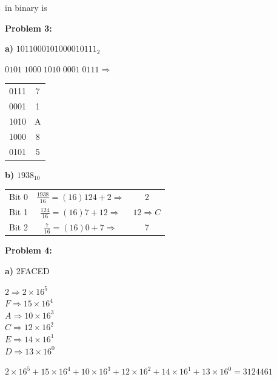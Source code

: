 \documentclass{article}
\begin{document}
    \quad{} in binary is 

    \textbf{Problem 3:}

    \quad \textbf{a)} $1011000101000010111_2$

    \quad\quad $0101 \; 1000 \; 1010 \; 0001 \; 0111 \Rightarrow$
    
    \begin{center}
        \begin{tabular}{ c|c }
            0111 & 7 \\
            0001 & 1 \\
            1010 & A \\
            1000 & 8 \\
            0101 & 5
        \end{tabular}
    \end{center}

    \quad\quad {}

    \quad \textbf{b)} $1938_{10}$

    \begin{center}
        \begin{tabular}{ c|c c }
            Bit 0 & $\frac{1938}{16} = (16)124 + 2 \Rightarrow$ & 2 \\
            Bit 1 & $\frac{124}{16} = (16)7 + 12 \Rightarrow$ & $12 \Rightarrow C$ \\
            Bit 2 & $\frac{7}{16} = (16)0 + 7 \Rightarrow$ & 7
        \end{tabular}
    \end{center}

    \quad\quad {}

    \textbf{Problem 4:}

    \quad \textbf{a)} 2FACED

    \begin{center}
        $2 \Rightarrow  2 \times 16^5$ \\
        $F \Rightarrow 15 \times 16^4$ \\
        $A \Rightarrow 10 \times 16^3$ \\
        $C \Rightarrow 12 \times 16^2$ \\
        $E \Rightarrow 14 \times 16^1$ \\
        $D \Rightarrow 13 \times 16^0$ \\
    \end{center}

    \quad\quad $2 \times 16^5 + 
        15 \times 16^4 + 
        10 \times 16^3 +
        12 \times 16^2 + 
        14 \times 16^1 + 
        13 \times 16^0 = \boxed{3124461}$
\end{document}
